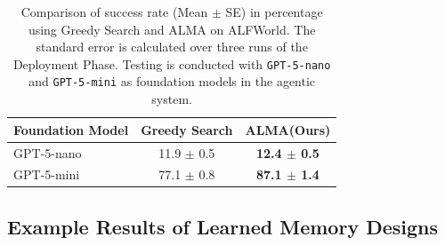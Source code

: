 \documentclass{article}
\theoremstyle{plain}
\theoremstyle{definition}
\theoremstyle{remark}
\newcommand{\ouralgo}{ALMA\xspace} %
\begin{document}
\begin{table}[htbp]
\centering
\captionsetup{aboveskip=5pt, belowskip=5pt}
\caption{Comparison of success rate (Mean $\pm$ SE) in percentage using Greedy Search and \ouralgo on ALFWorld. The standard error is calculated over three runs of the Deployment Phase. Testing is conducted with \texttt{GPT-5-nano} and \texttt{GPT-5-mini} as foundation models in the agentic system.}
\label{tab:greedy_vs_openended}
\footnotesize
\setlength{\tabcolsep}{6pt}
\begin{tabular}{l c c } 
\toprule
\textbf{Foundation Model} & \textbf{Greedy Search} & \textbf{\ouralgo (Ours)}\\
\midrule
GPT-5-nano & 11.9 $\pm$ 0.5 & \textbf{12.4 $\pm$ 0.5}\\
GPT-5-mini & 77.1 $\pm$ 0.8 & \textbf{87.1 $\pm$ 1.4}\\
\bottomrule
\end{tabular}
\vskip 10pt
\end{table}

\newpage
\subsection{Example Results of Learned Memory Designs}
\label{app:learned_design}





\end{document}
